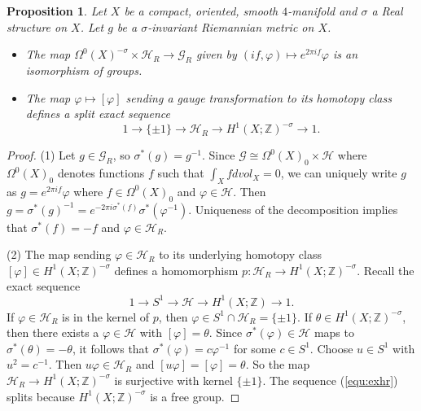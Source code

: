 \documentclass{amsart}
\newtheorem{proposition}[theorem]{Proposition}
\theoremstyle{definition}
\theoremstyle{remark}
\numberwithin{equation}{section}
\begin{document}
\begin{proposition}\label{prop:Rgauge}
Let $X$ be a compact, oriented, smooth $4$-manifold and $\sigma$ a Real structure on $X$. Let $g$ be a $\sigma$-invariant Riemannian metric on $X$.
\begin{itemize}
\item[(1)]{The map $\Omega^0(X)^{-\sigma} \times \mathcal{H}_R \to \mathcal{G}_R$ given by $( if , \varphi ) \mapsto e^{2 \pi if} \varphi$ is an isomorphism of groups.}
\item[(2)]{The map $\varphi \mapsto [\varphi]$ sending a gauge transformation to its homotopy class defines a split exact sequence
\begin{equation}\label{equ:exhr}
1 \to \{ \pm 1 \} \to \mathcal{H}_R \to H^1(X ; \mathbb{Z})^{-\sigma} \to 1.
\end{equation}
}
\end{itemize}
\end{proposition}
\begin{proof}
(1) Let $g \in \mathcal{G}_R$, so $\sigma^*(g) = g^{-1}$. Since $\mathcal{G} \cong \Omega^0(X)_0 \times \mathcal{H}$ where $\Omega^0(X)_0$ denotes functions $f$ such that $\int_X f dvol_X = 0$, we can uniquely write $g$ as $g = e^{2\pi i f} \varphi$ where $f \in \Omega^0(X)_0$ and $\varphi \in \mathcal{H}$. Then $g = \sigma^*(g)^{-1} = e^{-2 \pi i \sigma^*(f)} \sigma^*(\varphi^{-1})$. Uniqueness of the decomposition implies that $\sigma^*(f) = -f$ and $\varphi \in \mathcal{H}_R$.

(2) The map sending $\varphi \in \mathcal{H}_R$ to its underlying homotopy class $[\varphi] \in H^1(X ; \mathbb{Z})^{-\sigma}$ defines a homomorphism $p : \mathcal{H}_R \to H^1(X ; \mathbb{Z})^{-\sigma}$. Recall the exact sequence 
\[
1 \to S^1 \to \mathcal{H} \to H^1(X ; \mathbb{Z}) \to 1.
\]
If $\varphi \in \mathcal{H}_R$ is in the kernel of $p$, then $\varphi \in S^1 \cap \mathcal{H}_R = \{ \pm 1\}$. If $\theta \in H^1(X ; \mathbb{Z})^{-\sigma}$, then there exists a $\varphi \in \mathcal{H}$ with $[\varphi] = \theta$. Since $\sigma^*(\varphi) \in \mathcal{H}$ maps to $\sigma^*(\theta) = -\theta$, it follows that $\sigma^*(\varphi) = c \varphi^{-1}$ for some $c \in S^1$. Choose $u \in S^1$ with $u^2 = c^{-1}$. Then $u \varphi \in \mathcal{H}_R$ and $[u \varphi] = [\varphi] = \theta$. So the map $\mathcal{H}_R \to H^1(X;\mathbb{Z})^{-\sigma}$ is surjective with kernel $\{\pm 1\}$. The sequence (\ref{equ:exhr}) splits because $H^1(X ; \mathbb{Z})^{-\sigma}$ is a free group.
\end{proof}
\end{document}
